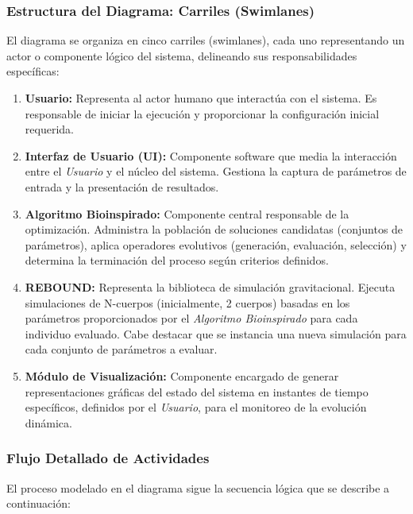 \subsubsection{Estructura del Diagrama: Carriles (Swimlanes)}

El diagrama se organiza en cinco carriles (swimlanes), cada uno representando un actor o componente lógico del sistema, delineando sus responsabilidades específicas:

\begin{enumerate}
    \item \textbf{Usuario:} Representa al actor humano que interactúa con el sistema. Es responsable de iniciar la ejecución y proporcionar la configuración inicial requerida.
    \item \textbf{Interfaz de Usuario (UI):} Componente software que media la interacción entre el \textit{Usuario} y el núcleo del sistema. Gestiona la captura de parámetros de entrada y la presentación de resultados.
    \item \textbf{Algoritmo Bioinspirado:} Componente central responsable de la optimización. Administra la población de soluciones candidatas (conjuntos de parámetros), aplica operadores evolutivos (generación, evaluación, selección) y determina la terminación del proceso según criterios definidos.
    \item \textbf{REBOUND:} Representa la biblioteca de simulación gravitacional. Ejecuta simulaciones de N-cuerpos (inicialmente, 2 cuerpos) basadas en los parámetros proporcionados por el \textit{Algoritmo Bioinspirado} para cada individuo evaluado. Cabe destacar que se instancia una nueva simulación para cada conjunto de parámetros a evaluar.
    \item \textbf{Módulo de Visualización:} Componente encargado de generar representaciones gráficas del estado del sistema en instantes de tiempo específicos, definidos por el \textit{Usuario}, para el monitoreo de la evolución dinámica.
\end{enumerate}

\subsubsection{Flujo Detallado de Actividades}

El proceso modelado en el diagrama sigue la secuencia lógica que se describe a continuación:

